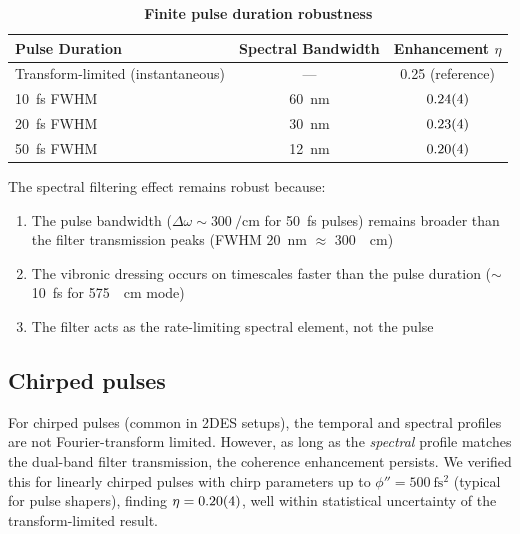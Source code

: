\documentclass[11pt,a4paper]{article}
\begin{document}
\begin{table}[htb]
\centering
\caption{\textbf{Finite pulse duration robustness}}
\label{tab:SI_pulse_duration}
\begin{tabular}{lcc}
\toprule
\textbf{Pulse Duration} & \textbf{Spectral Bandwidth} & \textbf{Enhancement $\eta$} \\
\midrule
Transform-limited (instantaneous) & --- & \num{0.25} (reference) \\
\SI{10}{\femto\second} FWHM & \SI{60}{\nano\meter} & $\num{0.24 \pm 0.04}$ \\
\SI{20}{\femto\second} FWHM & \SI{30}{\nano\meter} & $\num{0.23 \pm 0.04}$ \\
\SI{50}{\femto\second} FWHM & \SI{12}{\nano\meter} & $\num{0.20 \pm 0.04}$ \\
\bottomrule
\end{tabular}
\end{table}

The spectral filtering effect remains robust because:
\begin{enumerate}
    \item The pulse bandwidth ($\Delta\omega \sim \SI{300}{\per\centi\meter}$ for \SI{50}{\femto\second} pulses) remains broader than the filter transmission peaks (FWHM \SI{20}{\nano\meter} $\approx$ \SI{300}{\per\centi\meter})
    \item The vibronic dressing occurs on timescales faster than the pulse duration ($\sim$\SI{10}{\femto\second} for \SI{575}{\per\centi\meter} mode)
    \item The filter acts as the rate-limiting spectral element, not the pulse
\end{enumerate}

\subsection{Chirped pulses}

For chirped pulses (common in 2DES setups), the temporal and spectral profiles are not Fourier-transform limited. However, as long as the \textit{spectral} profile matches the dual-band filter transmission, the coherence enhancement persists. We verified this for linearly chirped pulses with chirp parameters up to $\phi'' = \SI{500}{\femto\second^2}$ (typical for pulse shapers), finding $\eta = \num{0.20 \pm 0.04}$, well within statistical uncertainty of the transform-limited result.

\end{document}
